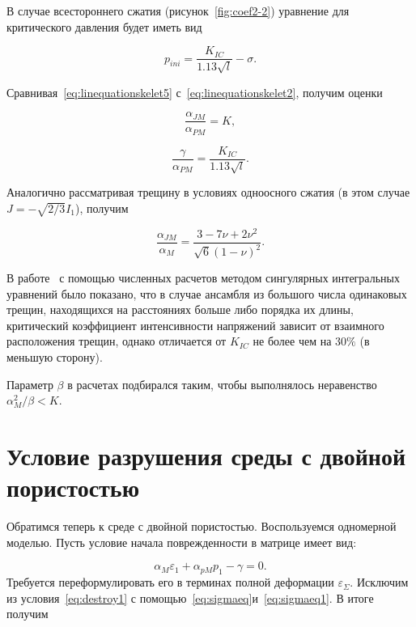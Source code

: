 В случае всестороннего сжатия (рисунок~\ref{fig:coef2-2}) уравнение для критического давления будет иметь вид

\begin{equation}
  \label{eq:omegaeq2}
  p_{ini} = \frac{K_{IC}}{1.13 \sqrt{l}} - \sigma.
\end{equation}

Сравнивая~\eqref{eq:linequationskelet5} с~\eqref{eq:linequationskelet2}, получим оценки

\begin{equation}
  \label{eq:omegaeq3}
  \frac{\alpha_{JM}}{\alpha_{PM}} = K,
\end{equation}

\begin{equation}
  \label{eq:omegaeq4}
  \frac{\gamma}{\alpha_{PM}} = \frac{K_{IC}}{1.13 \sqrt{l}}.
\end{equation}

Аналогично рассматривая трещину в условиях одноосного сжатия (в этом случае $J = -\sqrt{2/3}I_1$), получим

\begin{equation}
  \label{eq:omegaeq4}
  \frac{\alpha_{JM}}{\alpha_{M}} = \frac{3 - 7 \nu +2 \nu^2}{\sqrt{6}(1-\nu)^2}.
\end{equation}

В работе~\autocite{grytsenko2010numerical} с помощью численных расчетов методом сингулярных интегральных уравнений было показано, что в случае ансамбля из большого числа одинаковых трещин, находящихся на расстояниях больше либо порядка их длины, критический коэффициент интенсивности напряжений зависит от взаимного расположения трещин, однако отличается от $K_{IC}$ не более чем на $30\%$ (в меньшую сторону).

Параметр $\beta$ в расчетах подбирался таким, чтобы выполнялось неравенство $\alpha_{M}^2 /\beta < K$.

\section{Условие разрушения среды с двойной пористостью}\label{sec:ch2/sec03}

Обратимся теперь к среде с двойной пористостью. Воспользуемся одномерной моделью. Пусть условие начала поврежденности в матрице имеет вид:

\begin{equation}
  \label{eq:destroy1}
  \alpha_M \varepsilon_1 + \alpha_{pM} p_1 - \gamma = 0.
\end{equation}
Требуется переформулировать его в терминах полной деформации $\varepsilon_{\Sigma}$. Исключим  из условия~\eqref{eq:destroy1} с помощью~\eqref{eq:sigmaeq}и~\eqref{eq:sigmaeq1}. В итоге получим

